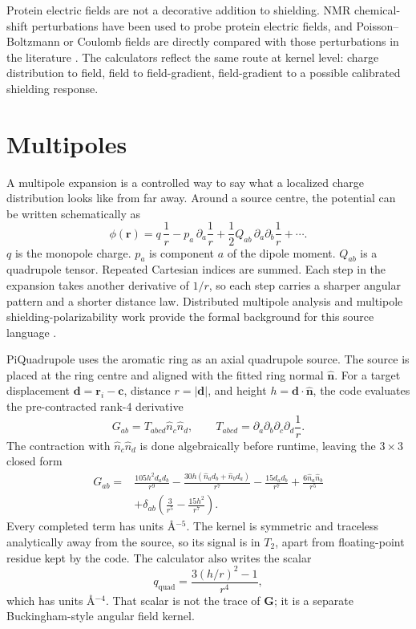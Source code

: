 \documentclass[11pt]{article}
\begin{document}
Protein electric fields are not a decorative addition to shielding. NMR
chemical-shift perturbations have been used to probe protein electric fields,
and Poisson--Boltzmann or Coulomb fields are directly compared with those
perturbations in the literature \cite{hass2008,kukic2013}. The calculators
reflect the same route at kernel level: charge distribution to field, field to
field-gradient, field-gradient to a possible calibrated shielding response.

\section{Multipoles}

A multipole expansion is a controlled way to say what a localized charge
distribution looks like from far away. Around a source centre, the potential can
be written schematically as
\[
  \phi(\bm r)
  =
  q\,\frac{1}{r}
  -p_a\,\partial_a\frac{1}{r}
  +\frac12 Q_{ab}\,\partial_a\partial_b\frac{1}{r}
  +\cdots .
\]
\(q\) is the monopole charge. \(p_a\) is component \(a\) of the dipole moment.
\(Q_{ab}\) is a quadrupole tensor. Repeated Cartesian indices are summed. Each
step in the expansion takes another derivative of \(1/r\), so each step carries
a sharper angular pattern and a shorter distance law. Distributed multipole
analysis and multipole shielding-polarizability work provide the formal
background for this source language \cite{stone2005,kjaer2011}.

PiQuadrupole uses the aromatic ring as an axial quadrupole source. The source
is placed at the ring centre and aligned with the fitted ring normal
\(\hat{\bm n}\). For a target displacement \(\bm d=\bm r_i-\bm c\), distance
\(r=|\bm d|\), and height \(h=\bm d\cdot\hat{\bm n}\), the code evaluates the
pre-contracted rank-4 derivative
\[
  G_{ab}=T_{abcd}\hat n_c\hat n_d,
  \qquad
  T_{abcd}
  =
  \partial_a\partial_b\partial_c\partial_d\frac{1}{r}.
\]
The contraction with \(\hat n_c\hat n_d\) is done algebraically before runtime,
leaving the \(3\times3\) closed form
\[
\begin{aligned}
  G_{ab}={}&
  \frac{105h^2 d_a d_b}{r^9}
  -\frac{30h(\hat n_a d_b+\hat n_b d_a)}{r^7}
  -\frac{15d_a d_b}{r^7}
  +\frac{6\hat n_a\hat n_b}{r^5} \\
  &+\delta_{ab}\left(\frac{3}{r^5}-\frac{15h^2}{r^7}\right).
\end{aligned}
\]
Every completed term has units \(\si{\angstrom^{-5}}\). The kernel is symmetric
and traceless analytically away from the source, so its signal is in \(T_2\),
apart from floating-point residue kept by the code. The calculator also writes
the scalar
\[
  q_{\mathrm{quad}}=\frac{3(h/r)^2-1}{r^4},
\]
which has units \(\si{\angstrom^{-4}}\). That scalar is not the trace of
\(\bm G\); it is a separate Buckingham-style angular field kernel.
\end{document}
